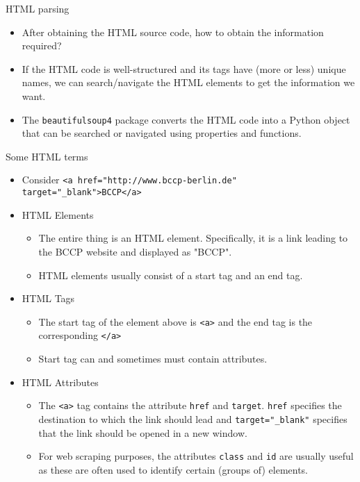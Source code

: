 \begin{frame}{HTML parsing}
\begin{itemize}
	\item After obtaining the HTML source code, how to obtain the information required?
	\item If the HTML code is well-structured and its tags have (more or less) unique names, we can search/navigate the HTML elements to get the information we want.
	\item The \texttt{beautifulsoup4} package converts the HTML code into a Python object that can be searched or navigated using properties and functions.
\end{itemize}
\end{frame}

\begin{frame}[fragile]{Some HTML terms}
\begin{itemize}
	\item Consider \texttt{<a href="http://www.bccp-berlin.de" target="_blank">BCCP</a>}
	\item HTML Elements
	\begin{itemize}
		\item The entire thing is an HTML element. Specifically, it is a link leading to the BCCP website and displayed as "BCCP".
		\item HTML elements usually consist of a start tag and an end tag.
	\end{itemize}
	\item HTML Tags
	\begin{itemize}
		\item The start tag of the element above is  \texttt{<a>} and the end tag is the corresponding  \texttt{</a>}
		\item Start tag can and sometimes must contain attributes.
	\end{itemize}
	\item HTML Attributes
	\begin{itemize}
		\item The  \texttt{<a>} tag contains the attribute  \texttt{href} and  \texttt{target}.  \texttt{href} specifies the destination to which the link should lead and  \texttt{target="_blank"} specifies that the link should be opened in a new window.
		\item For web scraping purposes, the attributes  \texttt{class} and  \texttt{id} are usually useful as these are often used to identify certain (groups of) elements.
	\end{itemize}
\end{itemize}
\end{frame}

